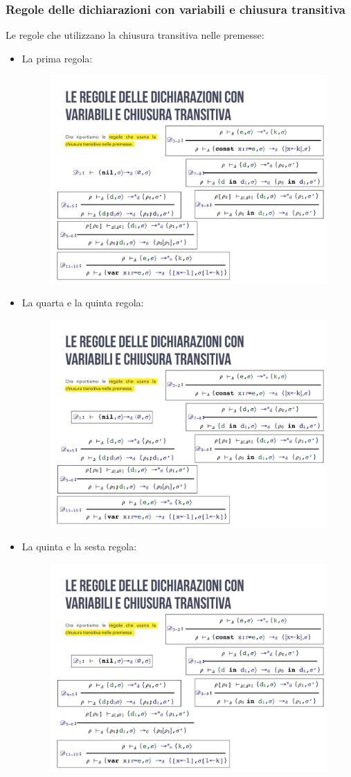 \documentclass[a4paper]{article}
\begin{document}
 	\subsubsection{Regole delle dichiarazioni con variabili e chiusura transitiva}
 	
 	Le regole che utilizzano la chiusura transitiva nelle premesse:
 	\begin{itemize}
 		\item La prima regola:
 		\begin{figure}[!htp]
 			\centering
 			\includegraphics[width=.5\textwidth]{img/regola_dichiarazione-up-transitiva-1.pdf}
 		\end{figure}
 	
 		\item La quarta e la quinta regola:
 		\begin{figure}[!htp]
 			\centering
 			\includegraphics[width=.7\textwidth]{img/regola_dichiarazione-up-transitiva-4_5.pdf}
 		\end{figure}
 	
 		\item La quinta e la sesta regola:
 		\begin{figure}[!htp]
 			\centering
 			\includegraphics[width=.8\textwidth]{img/regola_dichiarazione-up-transitiva-5_6.pdf}
 		\end{figure}
 		

\end{itemize}
\end{document}
